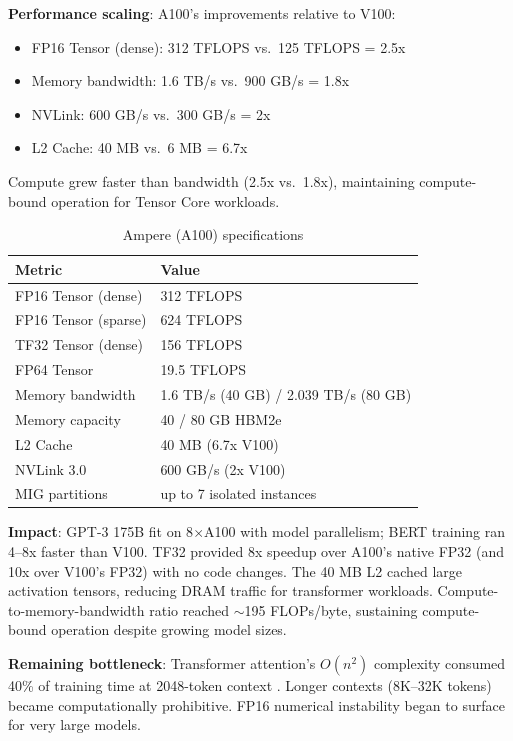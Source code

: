 \documentclass{article}
\begin{document}
\textbf{Performance scaling}: A100's improvements relative to V100:
\begin{itemize}
\item FP16 Tensor (dense): 312 TFLOPS vs.\ 125 TFLOPS = 2.5x
\item Memory bandwidth: 1.6 TB/s vs.\ 900 GB/s = 1.8x
\item NVLink: 600 GB/s vs.\ 300 GB/s = 2x
\item L2 Cache: 40 MB vs.\ 6 MB = 6.7x
\end{itemize}
Compute grew faster than bandwidth (2.5x vs.\ 1.8x), maintaining compute-bound operation for Tensor Core workloads.

\begin{table}[h]
\centering\small
\begin{tabular}{ll}
\toprule
Metric & Value \\
\midrule
FP16 Tensor (dense) & 312 TFLOPS \\
FP16 Tensor (sparse) & 624 TFLOPS \\
TF32 Tensor (dense) & 156 TFLOPS \\
FP64 Tensor & 19.5 TFLOPS \\
Memory bandwidth & 1.6 TB/s (40 GB) / 2.039 TB/s (80 GB) \\
Memory capacity & 40 / 80 GB HBM2e \\
L2 Cache & 40 MB (6.7x V100) \\
NVLink 3.0 & 600 GB/s (2x V100) \\
MIG partitions & up to 7 isolated instances \\
\bottomrule
\end{tabular}
\caption{Ampere (A100) specifications}
\end{table}

\textbf{Impact}: GPT-3 175B fit on 8$\times$A100 with model parallelism; BERT training ran 4--8x faster than V100. TF32 provided 8x speedup over A100's native FP32 (and 10x over V100's FP32) with no code changes. The 40 MB L2 cached large activation tensors, reducing DRAM traffic for transformer workloads. Compute-to-memory-bandwidth ratio reached $\sim$195 FLOPs/byte, sustaining compute-bound operation despite growing model sizes.

\textbf{Remaining bottleneck}: Transformer attention's $O(n^2)$ complexity consumed 40\% of training time at 2048-token context \cite{dao2021attention}. Longer contexts (8K--32K tokens) became computationally prohibitive. FP16 numerical instability began to surface for very large models.
\end{document}

